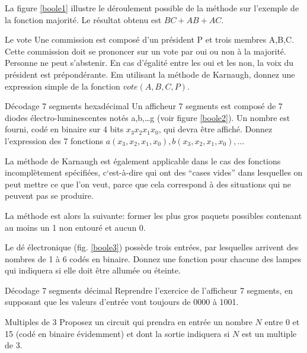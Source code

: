 La figure \ref{boole1} illustre le d\'eroulement possible de la m\'ethode
sur l'exemple de la fonction majorit\'e.
Le r\'esultat obtenu est $BC+AB+AC$.




\begin{exercice}{Le vote} Une commission est compos\'e d'un  pr\'esident
P et trois membres A,B,C.  Cette commission doit se prononcer
sur un vote par oui ou non \`a la majorit\'e.  Personne ne peut
s'abstenir. En cas d'égalit\'e entre les oui et les non, la voix
du pr\'esident est pr\'epond\'erante.  Em utilisant la m\'ethode
de Karnaugh, donnez une expression simple de la fonction 
$ vote(A,B,C,P)$.
\end{exercice}

\begin{exercice}{D\'ecodage 7 segments hexadécimal} Un afficheur 7 segments est compos\'e
de 7 diodes électro-luminescentes not\'es a,b,\ldots g (voir figure
\ref{boole2}). Un nombre est fourni, cod\'e en binaire
sur 4 bits $x_3x_2x_1x_0$, qui devra \^etre affich\'e. Donnez l'expression
des 7 fonctions $a(x_3,x_2,x_1,x_0), b(x_3,x_2,x_1,x_0), \ldots$

\end{exercice}

La m\'ethode de Karnaugh est également applicable dans le cas des
fonctions incompl\`etement sp\'ecifi\'ees, c`est-\`a-dire qui ont des
``cases vides'' dans lesquelles on peut mettre ce que l'on veut, parce
que cela correspond \`a des situations qui ne peuvent pas se produire.

La m\'ethode est alors la suivante: former les plus gros paquets possibles
contenant au moins un 1 non entour\'e et aucun 0.

 
\begin{exercice}{Le d\'e \'electronique} (fig. \ref{boole3}) poss\`ede trois entr\'ees, par lesquelles
arrivent des nombres de 1 \`a 6 cod\'es en binaire.  Donnez une fonction
pour chacune des lampes qui indiquera si elle doit \^etre allum\'ee ou 
\'eteinte.
\end{exercice}

\begin{exercice}{Décodage 7 segments décimal} Reprendre 
l'exercice de l'afficheur 7 segments, en supposant que les valeurs
d'entrée vont toujours de 0000 à 1001.
\end{exercice}

\begin{exercice}{Multiples de 3}
Proposez un circuit qui prendra en entr\'ee un nombre $N$ entre 0 et
15 (cod\'e en binaire \'evidemment) et dont la sortie indiquera si $N$
est un multiple de $3$.
\end{exercice}